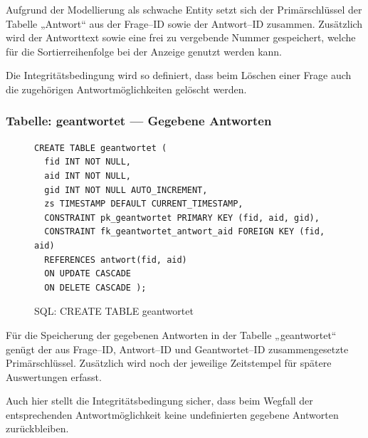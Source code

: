 Aufgrund der Modellierung als schwache Entity setzt sich der Primärschlüssel der Tabelle „Antwort“ aus der Frage--ID sowie der Antwort--ID zusammen. Zusätzlich wird der Antworttext sowie eine frei zu vergebende Nummer gespeichert, welche für die Sortierreihenfolge bei der Anzeige genutzt werden kann.

Die Integritätsbedingung wird so definiert, dass beim Löschen einer Frage auch die zugehörigen Antwortmöglichkeiten gelöscht werden.

\subsubsection{Tabelle: geantwortet --- Gegebene Antworten}
\begin{figure}[H]
\begin{spacing}{1.0}
\begin{verbatim}
CREATE TABLE geantwortet (
  fid INT NOT NULL,
  aid INT NOT NULL,
  gid INT NOT NULL AUTO_INCREMENT,
  zs TIMESTAMP DEFAULT CURRENT_TIMESTAMP,
  CONSTRAINT pk_geantwortet PRIMARY KEY (fid, aid, gid),
  CONSTRAINT fk_geantwortet_antwort_aid FOREIGN KEY (fid, aid) 
  REFERENCES antwort(fid, aid) 
  ON UPDATE CASCADE 
  ON DELETE CASCADE );
\end{verbatim}
\caption{SQL: CREATE TABLE geantwortet}
\label{sql:tblgeantwortet}
\end{spacing}
\end{figure}

Für die Speicherung der gegebenen Antworten in der Tabelle „geantwortet“ genügt der aus Frage--ID, Antwort--ID und Geantwortet--ID zusammengesetzte Primärschlüssel. Zusätzlich wird noch der jeweilige Zeitstempel für spätere Auswertungen erfasst.

Auch hier stellt die Integritätsbedingung sicher, dass beim Wegfall der entsprechenden Antwortmöglichkeit keine undefinierten gegebene Antworten zurückbleiben.
